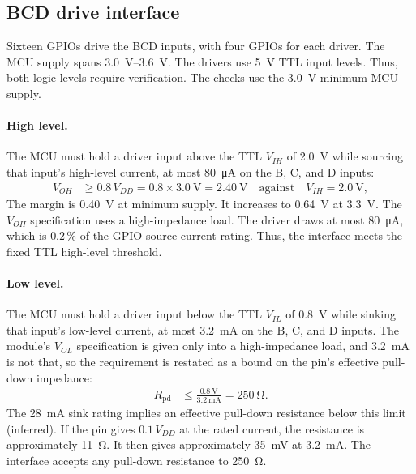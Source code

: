 \subsection{BCD drive interface}
\label{sec:esp32-bcd}

Sixteen GPIOs drive the BCD inputs, with four GPIOs for each driver. The MCU
supply spans \SIrange{3.0}{3.6}{\volt}. The drivers use 5~V TTL input levels.
Thus, both logic levels require verification. The checks use the
\SI{3.0}{\volt} minimum MCU supply.

\paragraph{High level.} The MCU must hold a driver input above the TTL
\(V_{IH}\) of \SI{2.0}{\volt} while sourcing that input's high-level current,
at most \SI{80}{\micro\ampere} on the B, C, and D inputs:
\begin{align*}
  V_{OH} &\geq 0.8\,V_{DD} = 0.8\times\SI{3.0}{\volt} = \SI{2.40}{\volt}
  \quad\text{against}\quad V_{IH} = \SI{2.0}{\volt},
\end{align*}
The margin is \SI{0.40}{\volt} at minimum supply. It increases to
\SI{0.64}{\volt} at \SI{3.3}{\volt}. The \(V_{OH}\) specification uses a
high-impedance load. The driver draws at most \SI{80}{\micro\ampere}, which is
$0.2\,\%$ of the GPIO source-current rating. Thus, the interface meets the
fixed TTL high-level threshold.

\paragraph{Low level.} The MCU must hold a driver input below the TTL
\(V_{IL}\) of \SI{0.8}{\volt} while sinking that input's low-level current, at
most \SI{3.2}{\milli\ampere} on the B, C, and D inputs. The module's
\(V_{OL}\) specification is given only into a high-impedance load, and
\SI{3.2}{\milli\ampere} is not that, so the requirement is restated as a bound
on the pin's effective pull-down impedance:
\begin{align*}
  R_{\mathrm{pd}} &\leq \frac{\SI{0.8}{\volt}}{\SI{3.2}{\milli\ampere}}
    = \SI{250}{\ohm}.
\end{align*}
The \SI{28}{\milli\ampere} sink rating implies an effective pull-down
resistance below this limit (inferred). If the pin gives \(0.1\,V_{DD}\) at the
rated current, the resistance is approximately \SI{11}{\ohm}. It then gives
approximately \SI{35}{\milli\volt} at \SI{3.2}{\milli\ampere}. The interface
accepts any pull-down resistance to \SI{250}{\ohm}.

